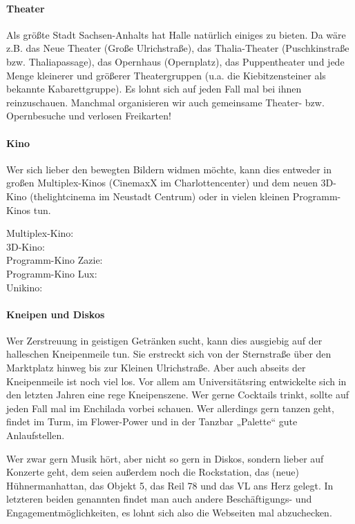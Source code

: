 \paragraph{Theater}
Als größte Stadt Sachsen-Anhalts hat Halle natürlich einiges zu bieten.
Da wäre z.B. das Neue Theater (Große Ulrichstraße), das Thalia-Theater (Puschkinstraße bzw. Thaliapassage), das Opernhaus (Opernplatz), das Puppentheater und jede Menge kleinerer und größerer Theatergruppen (\;u.a. die Kiebitzensteiner als bekannte Kabarettgruppe).
Es lohnt sich auf jeden Fall mal bei ihnen reinzuschauen.
Manchmal organisieren wir auch gemeinsame Theater- bzw. Opernbesuche und verlosen Freikarten!

\paragraph{Kino}
Wer sich lieber den bewegten Bildern widmen möchte, kann dies entweder in großen Multiplex-Kinos (CinemaxX im Charlottencenter) und dem neuen 3D-Kino (thelightcinema im Neustadt Centrum) oder in vielen kleinen Programm-Kinos tun.

Multiplex-Kino: \\
3D-Kino: \\
Programm-Kino Zazie: \\
Programm-Kino Lux: \\
Unikino: 


\paragraph{Kneipen und Diskos}
Wer Zerstreuung in geistigen Getränken sucht, kann dies ausgiebig auf der halleschen Kneipenmeile tun.
Sie erstreckt sich von der Sternstraße über den Marktplatz hinweg bis zur Kleinen Ulrichstraße.
Aber auch abseits der Kneipenmeile ist noch viel los.
Vor allem am Universitätsring entwickelte sich in den letzten Jahren eine rege Kneipenszene.
Wer gerne Cocktails trinkt, sollte auf jeden Fall mal im Enchilada vorbei schauen.
Wer allerdings gern tanzen geht, findet im Turm, im Flower-Power und in der Tanzbar „Palette“ gute Anlaufstellen.

Wer zwar gern Musik hört, aber nicht so gern in Diskos, sondern lieber auf Konzerte geht, dem seien außerdem noch die Rockstation, das (neue) Hühnermanhattan, das Objekt 5, das Reil 78 und das VL ans Herz gelegt.
In letzteren beiden genannten findet man auch andere Beschäftigungs- und Engagementmöglichkeiten, es lohnt sich also die Webseiten mal abzuchecken.

